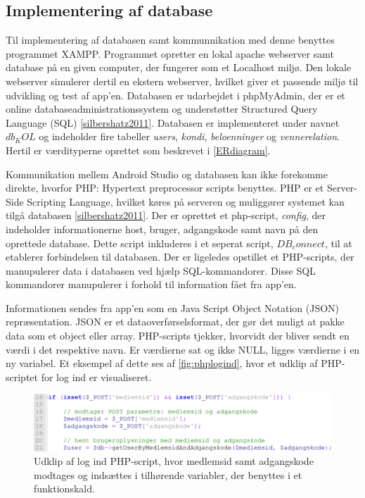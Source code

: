 \subsection{Implementering af database}

Til implementering af databasen samt kommunnikation med denne benyttes programmet XAMPP. Programmet opretter en lokal apache webserver samt database på en given computer, der fungerer som et Localhost miljø. Den lokale webserver simulerer dertil en ekstern webserver, hvilket giver et passende miljø til udvikling og test af app'en. Databasen er udarbejdet i phpMyAdmin, der er et online databaseadministrationssystem og understøtter Structured Query Language (SQL) \autoref{silbershatz2011}. 
Databasen er implementeret under navnet \textit{$db_KOL$} og indeholder fire tabeller \textit{users}, \textit{kondi}, \textit{beloenninger} og \textit{vennerelation}. Hertil er værdityperne oprettet som beskrevet i \autoref{ERdiagram}.

Kommunikation mellem Android Studio og databasen kan ikke forekomme direkte, hvorfor PHP: Hypertext preprocessor scripts benyttes. PHP er et Server-Side Scripting Language, hvilket køres på serveren og muliggører systemet kan tilgå databasen \autoref{silbershatz2011}. 
Der er oprettet et php-script, \textit{config}, der indeholder informationerne host, bruger, adgangskode samt navn på den oprettede database. Dette script inkluderes i et seperat script, \textit{$DB_connect$}, til at etablerer forbindelsen til databasen. Der er ligeledes opstillet et PHP-scripts, der manupulerer data i databasen ved hjælp SQL-kommandorer. Disse SQL kommandorer manupulerer i forhold til information fået fra app'en. 

Informationen sendes fra app'en som en Java Script Object Notation (JSON) repræsentation. JSON er et dataoverførselsformat, der  gør det muligt at pakke data som et object eller array. PHP-scripts tjekker, hvorvidt der bliver sendt en værdi i det respektive navn. Er værdierne sat og ikke NULL, ligges værdierne i en ny variabel. Et eksempel af dette ses af \autoref{fig:phplogind}, hvor et udklip af PHP-scriptet for log ind er visualiseret. 

\begin{figure} [H]
\centering
\includegraphics[width=1\textwidth]{figures/imple/phplogind}
\caption{Udklip af log ind PHP-script, hvor medlemsid samt adgangskode modtages og indsættes i tilhørende variabler, der benyttes i et funktionskald.}
\label{fig:phplogind}
\end{figure}

